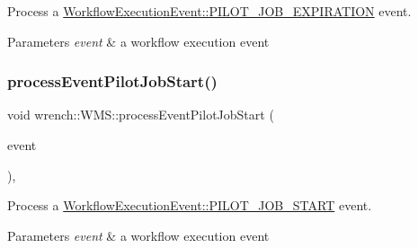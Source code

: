 Process a \hyperlink{classwrench_1_1_workflow_execution_event_a5611165191fbc4d121d1b141c748a448a876a714eb40717c19e1450da162208f2}{Workflow\+Execution\+Event\+::\+P\+I\+L\+O\+T\+\_\+\+J\+O\+B\+\_\+\+E\+X\+P\+I\+R\+A\+T\+I\+ON} event. 


\begin{DoxyParams}{Parameters}
{\em event} & a workflow execution event \\
\hline
\end{DoxyParams}
\mbox{\label{classwrench_1_1_w_m_s_a2044fcfb8fdd1908f50303d6faf0a2f0}} 
\subsubsection{\texorpdfstring{process\+Event\+Pilot\+Job\+Start()}{processEventPilotJobStart()}}
{\footnotesize\ttfamily void wrench\+::\+W\+M\+S\+::process\+Event\+Pilot\+Job\+Start (\begin{DoxyParamCaption}\item[{std\+::unique\+\_\+ptr$<$ \hyperlink{classwrench_1_1_pilot_job_started_event}{Pilot\+Job\+Started\+Event} $>$}]{event }\end{DoxyParamCaption})\hspace{0.3cm}{\ttfamily [protected]}, {\ttfamily [virtual]}}



Process a \hyperlink{classwrench_1_1_workflow_execution_event_a5611165191fbc4d121d1b141c748a448acdc1aeb7d7f0638c64d3a8c3cd05c8a4}{Workflow\+Execution\+Event\+::\+P\+I\+L\+O\+T\+\_\+\+J\+O\+B\+\_\+\+S\+T\+A\+RT} event. 


\begin{DoxyParams}{Parameters}
{\em event} & a workflow execution event \\
\hline
\end{DoxyParams}
\mbox{\label{classwrench_1_1_w_m_s_aa00aeb9c502fc794efb4dbe69e800e49}} 
